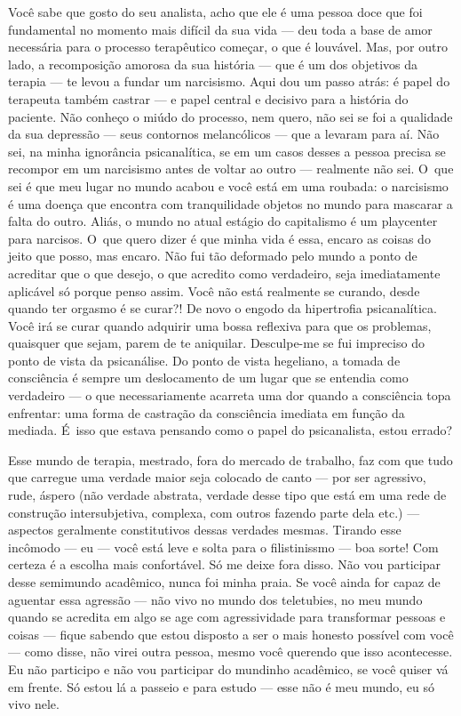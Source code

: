 Você sabe que gosto do seu analista, acho que ele é uma pessoa doce que
foi fundamental no momento mais difícil da sua vida --- deu toda a base
de amor necessária para o processo terapêutico começar, o que é
louvável. Mas, por outro lado, a recomposição amorosa da sua história
--- que é um dos objetivos da terapia --- te levou a fundar um
narcisismo. Aqui dou um passo atrás: é papel do terapeuta também castrar
--- e papel central e decisivo para a história do paciente. Não conheço
o miúdo do processo, nem quero, não sei se foi a qualidade da sua
depressão --- seus contornos melancólicos --- que a levaram para aí. Não
sei, na minha ignorância psicanalítica, se em um casos desses a pessoa
precisa se recompor em um narcisismo antes de voltar ao outro ---
realmente não sei. O~que sei é que meu lugar no mundo acabou e você está
em uma roubada: o narcisismo é uma doença que encontra com tranquilidade
objetos no mundo para mascarar a falta do outro. Aliás, o mundo no atual
estágio do capitalismo é um playcenter para narcisos. O~que quero dizer
é que minha vida é essa, encaro as coisas do jeito que posso, mas
encaro. Não fui tão deformado pelo mundo a ponto de acreditar que o que
desejo, o que acredito como verdadeiro, seja imediatamente aplicável só
porque penso assim. Você não está realmente se curando, desde quando ter
orgasmo é se curar?! De novo o engodo da hipertrofia psicanalítica. Você
irá se curar quando adquirir uma bossa reflexiva para que os problemas,
quaisquer que sejam, parem de te aniquilar. Desculpe-me se fui impreciso
do ponto de vista da psicanálise. Do ponto de vista hegeliano, a tomada
de consciência é sempre um deslocamento de um lugar que se entendia como
verdadeiro --- o que necessariamente acarreta uma dor quando a
consciência topa enfrentar: uma forma de castração da consciência
imediata em função da mediada. É~isso que estava pensando como o papel
do psicanalista, estou errado?

Esse mundo de terapia, mestrado, fora do mercado de trabalho, faz com
que tudo que carregue uma verdade maior seja colocado de canto --- por
ser agressivo, rude, áspero (não verdade abstrata, verdade desse tipo
que está em uma rede de construção intersubjetiva, complexa, com outros
fazendo parte dela etc.) --- aspectos geralmente constitutivos dessas
verdades mesmas. Tirando esse incômodo --- eu --- você está leve e solta
para o filistinissmo --- boa sorte! Com certeza é a escolha mais
confortável. Só me deixe fora disso. Não vou participar desse semimundo
acadêmico, nunca foi minha praia. Se você ainda for capaz de aguentar
essa agressão --- não vivo no mundo dos teletubies, no meu mundo quando
se acredita em algo se age com agressividade para transformar pessoas e
coisas --- fique sabendo que estou disposto a ser o mais honesto
possível com você --- como disse, não virei outra pessoa, mesmo você
querendo que isso acontecesse. Eu não participo e não vou participar do
mundinho acadêmico, se você quiser vá em frente. Só estou lá a passeio e
para estudo --- esse não é meu mundo, eu só vivo nele.

